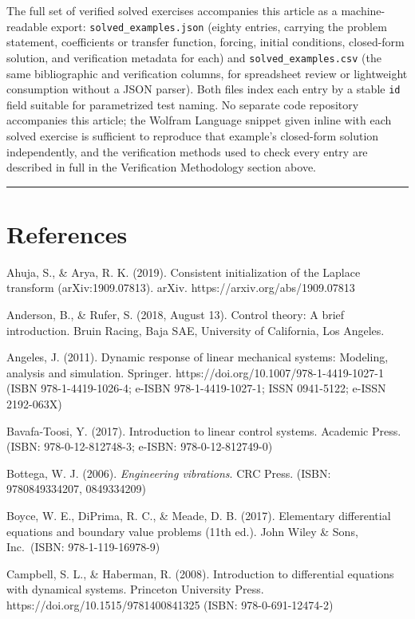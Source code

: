 \documentclass[
  11pt,
]{article}
\begin{document}
The full set of verified solved exercises accompanies this article as a
machine-readable export: \texttt{solved\_examples.json} (eighty entries,
carrying the problem statement, coefficients or transfer function,
forcing, initial conditions, closed-form solution, and verification
metadata for each) and \texttt{solved\_examples.csv} (the same
bibliographic and verification columns, for spreadsheet review or
lightweight consumption without a JSON parser). Both files index each
entry by a stable \texttt{id} field suitable for parametrized test
naming. No separate code repository accompanies this article; the
Wolfram Language snippet given inline with each solved exercise is
sufficient to reproduce that example's closed-form solution
independently, and the verification methods used to check every entry
are described in full in the Verification Methodology section above.

\begin{center}\rule{0.5\linewidth}{0.5pt}\end{center}

\hypertarget{references}{%
\section{References}\label{references}}

Ahuja, S., \& Arya, R. K. (2019). Consistent initialization of the
Laplace transform (arXiv:1909.07813). arXiv.
https://arxiv.org/abs/1909.07813

Anderson, B., \& Rufer, S. (2018, August 13). Control theory: A brief
introduction. Bruin Racing, Baja SAE, University of California, Los
Angeles.

Angeles, J. (2011). Dynamic response of linear mechanical systems:
Modeling, analysis and simulation. Springer.
https://doi.org/10.1007/978-1-4419-1027-1 (ISBN 978-1-4419-1026-4;
e-ISBN 978-1-4419-1027-1; ISSN 0941-5122; e-ISSN 2192-063X)

Bavafa-Toosi, Y. (2017). Introduction to linear control systems.
Academic Press. (ISBN: 978-0-12-812748-3; e-ISBN: 978-0-12-812749-0)

Bottega, W. J. (2006). \emph{Engineering vibrations}. CRC Press. (ISBN:
9780849334207, 0849334209)

Boyce, W. E., DiPrima, R. C., \& Meade, D. B. (2017). Elementary
differential equations and boundary value problems (11th ed.). John
Wiley \& Sons, Inc.~(ISBN: 978-1-119-16978-9)

Campbell, S. L., \& Haberman, R. (2008). Introduction to differential
equations with dynamical systems. Princeton University Press.
https://doi.org/10.1515/9781400841325 (ISBN: 978-0-691-12474-2)
\end{document}
